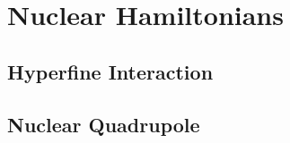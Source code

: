 \section{Nuclear Hamiltonians}

\subsection{Hyperfine Interaction}
\lipsum[1-3]

\subsection{Nuclear Quadrupole}
\lipsum[4-6]
